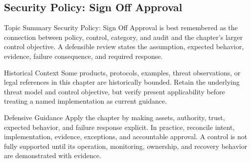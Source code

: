 \documentclass[11pt,letterpaper]{article}
\begin{document}
\subsection*{Security Policy: Sign Off Approval}
\begin{CornellNotesTable}
\end{CornellNotesTable}
\begin{CornellSummaryBox}{Topic Summary}
Security Policy: Sign Off Approval is best remembered as the connection between policy, control, category, and audit and the chapter's larger control objective. A defensible review states the assumption, expected behavior, evidence, failure consequence, and required response.
\end{CornellSummaryBox}
\begin{CornellWarningBox}{Historical Context}
Some products, protocols, examples, threat observations, or legal references in this chapter are historically bounded. Retain the underlying threat model and control objective, but verify present applicability before treating a named implementation as current guidance.
\end{CornellWarningBox}
\begin{CornellOverviewBox}{Defensive Guidance}
Apply the chapter by making assets, authority, trust, expected behavior, and failure response explicit. In practice, reconcile intent, implementation, evidence, exceptions, and accountable approval. A control is not fully supported until its operation, monitoring, ownership, and recovery behavior are demonstrated with evidence.
\end{CornellOverviewBox}
\end{document}
